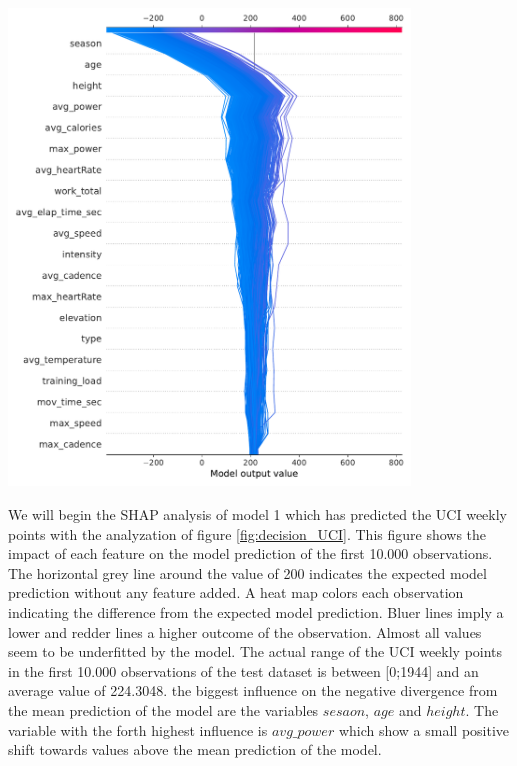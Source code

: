\documentclass[12pt,a4paper]{article}
\let\origfigure\figure
\let\endorigfigure\endfigure
\renewenvironment{figure}[1][2] {
    \expandafter\origfigure\expandafter[H]
} {
    \endorigfigure
}
\begin{document}
\begin{figure}
\centering
\hspace{-3cm}\includegraphics[width=0.8\textwidth]{./includes/shap/lightgbm/decision_UCI_points.pdf}
    \caption{This figure shows a feature decision plot of each variable  of model 1 fitted with the Lightgbm algorithm predicting the UCI weekly points. All values were calculated from the first 10.000 observations the test dataset. }
    \label{fig:decision_UCI}
\end{figure}

We will begin the SHAP analysis of model 1 which has predicted the UCI weekly points with the analyzation of figure \ref{fig:decision_UCI}. This figure shows the impact of each feature on the model prediction of the first 10.000 observations. The horizontal grey line around the value of 200 indicates the expected model prediction without any feature added. A heat map colors each observation indicating the difference from the expected model prediction. Bluer lines imply a lower and redder lines a higher outcome of the observation. Almost all values seem to be underfitted by the model. The actual range of the UCI weekly points in the first 10.000 observations of the test dataset is between {[}0;1944{]} and an average value of 224.3048. the biggest influence on the negative divergence from the mean prediction of the model are the variables \(sesaon\), \(age\) and \(height\). The variable with the forth highest influence is \(avg\_power\) which show a small positive shift towards values above the mean prediction of the model.
\end{document}
